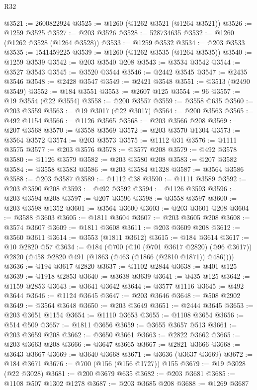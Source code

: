 \begin{lexlean}{R32}
\begin{coremodule}
@3521 := 2600822924
@3525 := @1260 (@1262 @3521 (@1264 @3521))
@3526 := @1259 @3525
@3527 := @203 @3526
@3528 := 528734635
@3532 := @1260 (@1262 @3528 (@1264 @3528))
@3533 := @1259 @3532
@3534 := @203 @3533
@3535 := 1541459225
@3539 := @1260 (@1262 @3535 (@1264 @3535))
@3540 := @1259 @3539
@3542 := @203 @3540 @208
@3543 := @3534 @3542
@3544 := @3527 @3543
@3545 := @3520 @3544
@3546 := @2442 @3545
@3547 := @2435 @3546
@3548 := @2428 @3547
@3549 := @2421 @3548
@3551 := @3513 (@2490 @3549)
@3552 := @184 @3551
@3553 := @2607 @125
@3554 := 96
@3557 := @19 @3554 (@22 @3554)
@3558 := @200 @3557
@3559 := @3558 @635
@3560 := @203 @3559
@3563 := @19 @3017 (@22 @3017)
@3564 := @200 @3563
@3565 := @492 @1154
@3566 := @1126 @3565
@3568 := @203 @3566 @208
@3569 := @207 @3568
@3570 := @3558 @3569
@3572 := @203 @3570 @1304
@3573 := @3564 @3572
@3574 := @203 @3573
@3575 := @1112 @31
@3576 := @1111 @3575
@3577 := @203 @3576
@3578 := @3577 @208
@3579 := @492 @3578
@3580 := @1126 @3579
@3582 := @203 @3580 @208
@3583 := @207 @3582
@3584 := @3558 @3583
@3586 := @203 @3584 @1328
@3587 := @3564 @3586
@3588 := @203 @3587
@3589 := @1112 @38
@3590 := @1111 @3589
@3592 := @203 @3590 @208
@3593 := @492 @3592
@3594 := @1126 @3593
@3596 := @203 @3594 @208
@3597 := @207 @3596
@3598 := @3558 @3597
@3600 := @203 @3598 @1352
@3601 := @3564 @3600
@3603 := @203 @3601 @208
@3604 := @3588 @3603
@3605 := @1811 @3604
@3607 := @203 @3605 @208
@3608 := @3574 @3607
@3609 := @1811 @3608
@3611 := @203 @3609 @208
@3612 := @3560 @3611
@3614 := @3553 (@1811 @3612)
@3615 := @184 @3614
@3617 := @10 @2820 @57
@3634 := @184
    (@700
      (@10 (@701 @3617 @2820) (@96 @3617))
      @2820
      (@458 @2820 @491 (@1863 (@463 (@1866 (@2810 @1871)) @486))))
@3636 := @194 @3617 @2820
@3637 := @1102 @2844
@3638 := @401 @125
@3639 := @1918 @2853
@3640 := @3638 @3639
@3641 := @435 @125
@3642 := @1159 @2853
@3643 := @3641 @3642
@3644 := @3577 @1116
@3645 := @492 @3644
@3646 := @1124 @3645
@3647 := @203 @3646
@3648 := @508 @2902
@3649 := @3564 @3648
@3650 := @203 @3649
@3651 := @2444 @3645
@3653 := @203 @3651 @1154
@3654 := @1110 @3653
@3655 := @1108 @3654
@3656 := @514 @509
@3657 := @1811 @3656
@3659 := @3655 @3657 @513
@3661 := @203 @3659 @208
@3662 := @3650 @3661
@3663 := @2822 @3662
@3665 := @203 @3663 @208
@3666 := @3647 @3665
@3667 := @2821 @3666
@3668 := @3643 @3667
@3669 := @3640 @3668
@3671 := @3636 (@3637 @3669)
@3672 := @184 @3671
@3676 := @700 (@156 (@156 @1727)) @155
@3679 := @19 @3028 (@22 @3028)
@3681 := @200 @3679 @635
@3682 := @203 @3681
@3685 := @1108 @507 @1302 @1278
@3687 := @203 @3685 @208
@3688 := @1269 @3687

\end{coremodule}
\end{lexlean}
